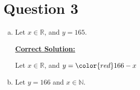 \documentclass[12pt]{article}
\begin{document}
\section*{Question 3}
\begin{enumerate}[a.]
    \item

    Let $x \in \mathbb{R}$, and $y = 165$.

    \begin{mdframed}
        \underline{\textbf{Correct Solution:}}

        \bigskip

        Let $x \in \mathbb{R}$, and $y = \color{red} 166 - x$
    \end{mdframed}

    \item

    Let $y = 166$ and $x \in \mathbb{N}$.
\end{enumerate}
\end{document}
